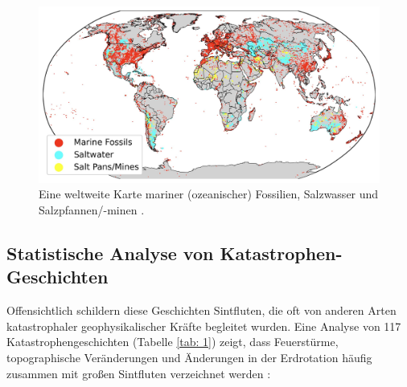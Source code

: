 \documentclass[10pt,twocolumn,letterpaper]{article}
\begin{document}
\begin{figure}[b]
\begin{center}
\includegraphics[width=1\textwidth]{marine.jpg}
\end{center}
   \caption{Eine weltweite Karte mariner (ozeanischer) Fossilien, Salzwasser und Salzpfannen/-minen \cite{15,16,86,87}.}

   \label{fig:2}
\end{figure}

\subsection{Statistische Analyse von Katastrophen-Geschichten}

Offensichtlich schildern diese Geschichten Sintfluten, die oft von anderen Arten katastrophaler geophysikalischer Kräfte begleitet wurden. Eine Analyse von 117 Katastrophengeschichten (Tabelle \ref{tab: 1}) zeigt, dass Feuerstürme, topographische Veränderungen und Änderungen in der Erdrotation häufig zusammen mit großen Sintfluten verzeichnet werden \cite{14}:
\end{document}
